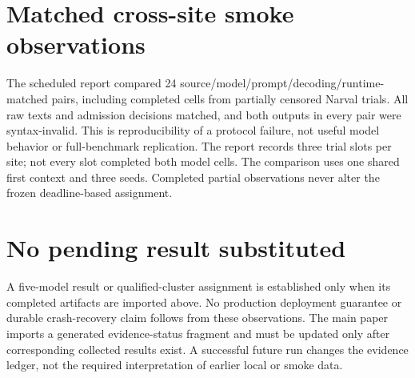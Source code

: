 \documentclass[11pt]{article}
\begin{document}
\section{Matched cross-site smoke observations}
The scheduled report compared 24 source/model/prompt/decoding/runtime-matched pairs, including completed cells from partially censored Narval trials. All raw texts and admission decisions matched, and both outputs in every pair were syntax-invalid. This is reproducibility of a protocol failure, not useful model behavior or full-benchmark replication. The report records three trial slots per site; not every slot completed both model cells. The comparison uses one shared first context and three seeds. Completed partial observations never alter the frozen deadline-based assignment.

\section{No pending result substituted}
A five-model result or qualified-cluster assignment is established only when its completed artifacts are imported above. No production deployment guarantee or durable crash-recovery claim follows from these observations. The main paper imports a generated evidence-status fragment and must be updated only after corresponding collected results exist. A successful future run changes the evidence ledger, not the required interpretation of earlier local or smoke data.
\end{document}
